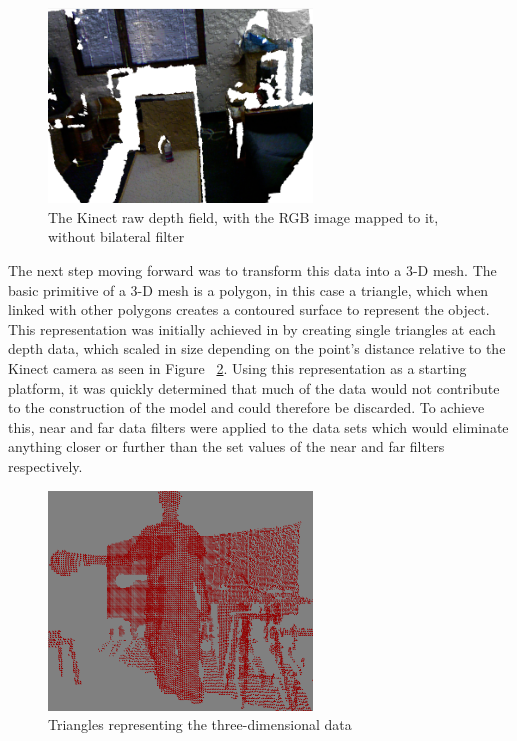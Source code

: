 \documentclass[pdftex,10.5pt]{report}
\begin{document}
\begin{figure}[H]
	\centering
	\includegraphics[width=70mm]{figures/kinectwaterbottle.png}
	\caption{The Kinect raw depth field, with the RGB image mapped to it, without bilateral filter}
	\label{waterbot}
\end{figure}

The next step moving forward was to transform this data into a 3-D mesh. The basic primitive of a 3-D mesh is a polygon, in this case a triangle, which when linked with other polygons creates a contoured surface to represent the object. This representation was initially achieved in by creating single triangles at each depth data, which scaled in size depending on the point's distance relative to the Kinect camera as seen in Figure ~\ref{3dtri}. Using this representation as a starting platform, it was quickly determined that much of the data would not contribute to the construction of the model and could therefore be discarded. To achieve this, near and far data filters were applied to the data sets which would eliminate anything closer or further than the set values of the near and far filters respectively.

\begin{figure}[H]
	\centering
	\includegraphics[width=70mm]{figures/3dtriangles.png}
	\caption{Triangles representing the three-dimensional data}
	\label{3dtri}
\end{figure}
\end{document}

